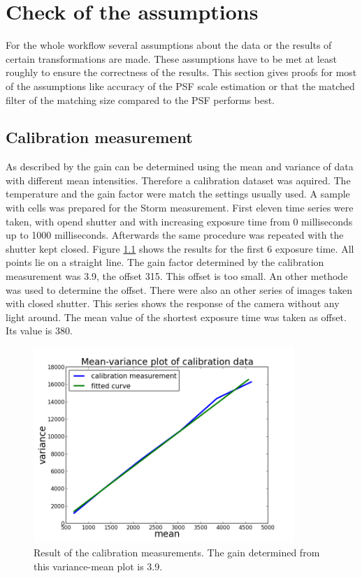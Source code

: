 \chapter{Check of the assumptions}
For the whole workflow several assumptions about the data or the results of certain transformations are made. These assumptions have to be met at least roughly to ensure the correctness of the results.\newline
This section gives proofs for most of the assumptions like accuracy of the PSF scale estimation or that the matched filter of the matching size compared to the PSF performs best.
\section{Calibration measurement}
As described by \cite{meanVar} the gain can be determined using the mean and variance of data with different mean intensities. Therefore a calibration dataset was aquired. The temperature and the gain factor were match the settings usually used. A sample with cells was prepared for the Storm measurement. First eleven time series were taken, with opend shutter and with increasing exposure time from 0 milliseconds up to 1000 milliseconds. Afterwards the same procedure was repeated with the shutter kept closed. Figure \ref{calibplot} shows the results for the first 6 exposure time. All points lie on a straight line. The gain factor determined by the calibration measurement was 3.9, the offset 315. This offset is too small. An other methode was used to determine the offset. There were also an other series of  images taken with closed shutter. This series shows the response of the camera without any light around. The mean value of the shortest exposure time was taken as offset. Its value is 380. 
\begin{figure}
\centering
\includegraphics[width = 0.88\textwidth]{pictures/meanVariancePlotCalibration.png}
	 \caption{Result of the calibration measurements. The gain determined from this variance-mean plot is 3.9.}
	\label{calibplot}
\end{figure}


